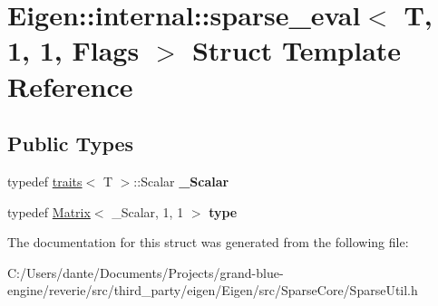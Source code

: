 \hypertarget{struct_eigen_1_1internal_1_1sparse__eval_3_01_t_00_011_00_011_00_01_flags_01_4}{}\section{Eigen\+::internal\+::sparse\+\_\+eval$<$ T, 1, 1, Flags $>$ Struct Template Reference}
\label{struct_eigen_1_1internal_1_1sparse__eval_3_01_t_00_011_00_011_00_01_flags_01_4}
\subsection*{Public Types}
\begin{DoxyCompactItemize}
\item 
\mbox{\label{struct_eigen_1_1internal_1_1sparse__eval_3_01_t_00_011_00_011_00_01_flags_01_4_a5867cb3ad07eb8f52b03f0da80847188}} 
typedef \mbox{\hyperlink{struct_eigen_1_1internal_1_1traits}{traits}}$<$ T $>$\+::Scalar {\bfseries \+\_\+\+Scalar}
\item 
\mbox{\label{struct_eigen_1_1internal_1_1sparse__eval_3_01_t_00_011_00_011_00_01_flags_01_4_a4910818b2fd76342f9174e53427ac8fd}} 
typedef \mbox{\hyperlink{class_eigen_1_1_matrix}{Matrix}}$<$ \+\_\+\+Scalar, 1, 1 $>$ {\bfseries type}
\end{DoxyCompactItemize}


The documentation for this struct was generated from the following file\+:\begin{DoxyCompactItemize}
\item 
C\+:/\+Users/dante/\+Documents/\+Projects/grand-\/blue-\/engine/reverie/src/third\+\_\+party/eigen/\+Eigen/src/\+Sparse\+Core/Sparse\+Util.\+h\end{DoxyCompactItemize}
